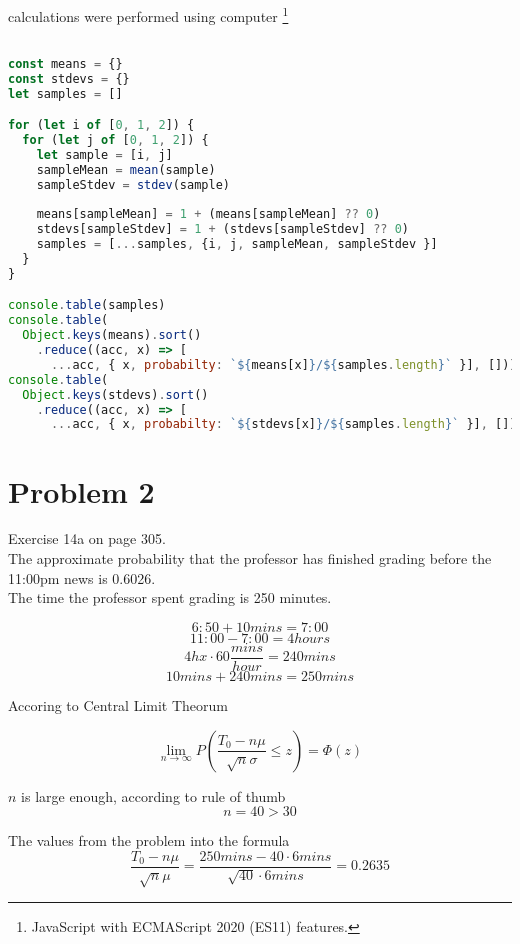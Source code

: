 \documentclass[a4paper,11pt]{article}
\begin{document}
\clearpage

calculations were performed using computer \footnote[1]{JavaScript with ECMAScript 2020 (ES11) features.}
\begin{lstlisting}[language=JavaScript]

const means = {}
const stdevs = {}
let samples = []

for (let i of [0, 1, 2]) {
  for (let j of [0, 1, 2]) {
    let sample = [i, j]
    sampleMean = mean(sample)
    sampleStdev = stdev(sample)
    
    means[sampleMean] = 1 + (means[sampleMean] ?? 0)
    stdevs[sampleStdev] = 1 + (stdevs[sampleStdev] ?? 0)
    samples = [...samples, {i, j, sampleMean, sampleStdev }]
  }
}

console.table(samples)
console.table(
  Object.keys(means).sort()
    .reduce((acc, x) => [ 
      ...acc, { x, probabilty: `${means[x]}/${samples.length}` }], []))
console.table(
  Object.keys(stdevs).sort()
    .reduce((acc, x) => [ 
      ...acc, { x, probabilty: `${stdevs[x]}/${samples.length}` }], []))
\end{lstlisting}

\clearpage

\section*{Problem 2}

Exercise 14a on page 305. \\

The approximate probability that the professor has finished grading before the 11:00pm news is 0.6026.\\

The time the professor spent grading is 250 minutes.

\[ 6:50 + 10 mins = 7:00 \]
\[ 11:00 - 7:00  = 4 hours \]
\[ 4h x \cdot 60\frac{mins}{hour} = 240 mins \]
\[ 10 mins + 240 mins = 250 mins \]

Accoring to Central Limit Theorum

\[ \lim_{n \rightarrow \infty} P\left(\frac{T_0 - n \mu}{\sqrt{n} \sigma} \le z \right) = \Phi(z) \]

\vspace{1cm}
$n$ is large enough, according to rule of thumb
\[ n = 40 > 30\]

The values from the problem into the formula
\[ \frac{T_0 - n \mu}{\sqrt{n} \mu} = \frac{250 mins - 40 \cdot 6 mins }{\sqrt{40} \cdot 6 mins} = 0.2635 \]
\end{document}
